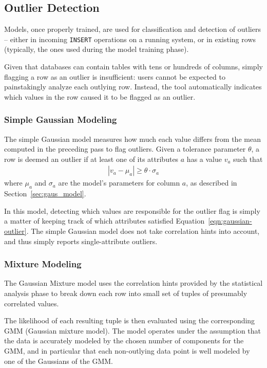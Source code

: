 \subsection{Outlier Detection}
\label{sec:outlier-detection}

Models, once properly trained, are used for classification and detection of outliers -- either in incoming \texttt{INSERT} operations on a running system, or in existing rows (typically, the ones used during the model training phase). %

Given that databases can contain tables with tens or hundreds of columns, simply flagging a row as an outlier is insufficient: users cannot be expected to painstakingly analyze each outlying row. Instead, the tool automatically indicates which values in the row caused it to be flagged as an outlier.

\subsubsection{Simple Gaussian Modeling}
The simple Gaussian model measures how much each value differs from the mean computed in the preceding pass to flag outliers. Given a tolerance parameter $\theta$, a row is deemed an outlier if at least one of its attributes $a$ has a value $v_a$ such that
\begin{align}
  |v_a - \mu_a| \ge \theta \cdot \sigma_a
  \label{eqn:gaussian-outlier}
\end{align}
where $\mu_a$ and $\sigma_a$ are the model's parameters for column $a$, as described in Section~\ref{sec:gaus_model}.

In this model, detecting which values are responsible for the outlier flag is simply a matter of keeping track of which attributes satisfied Equation~\eqref{eqn:gaussian-outlier}. The simple Gaussian model does not take correlation hints into account, and thus simply reports single-attribute outliers.

\subsubsection{Mixture Modeling}
The Gaussian Mixture model uses the correlation hints provided by the statistical analysis phase to break down each row into small set of tuples of presumably correlated values.

The likelihood of each resulting tuple is then evaluated using the corresponding GMM (Gaussian mixture model). The model operates under the assumption that the data is accurately modeled by the chosen number of components for the GMM, and in particular that each non-outlying data point is well modeled by one of the Gaussians of the GMM. 

